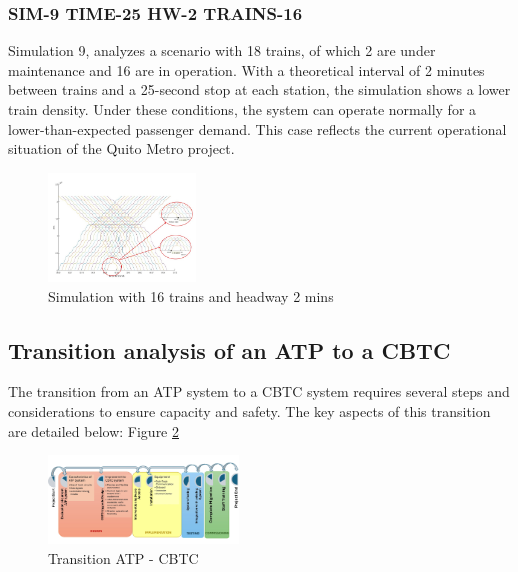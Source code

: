 \documentclass[conference]{IEEEtran}
\begin{document}
\subsubsection{SIM-9 TIME-25 HW-2 TRAINS-16}
Simulation 9, analyzes a scenario with 18 trains, of which 2 are under maintenance and 16 are in operation\cite{b20}. With a theoretical interval of 2 minutes between trains and a 25-second stop at each station, the simulation shows a lower train density. Under these conditions, the system can operate normally for a lower-than-expected passenger demand. This case reflects the current operational situation of the Quito Metro project\cite{b19}.
\begin{figure}[htbp]
    \centering
\includegraphics[width=0.35\textwidth,scale=1]{Imagenes_general/SIM-9_TIME-25_HW-2_TRAINS-16.jpg}
    \caption{Simulation with 16 trains and headway 2 mins}
    \label{fig:Simulation 9: 16 Trains / 2 mins headway}
\end{figure}

\subsection{Transition analysis of an ATP to a CBTC}
The transition from an ATP system to a CBTC system requires several steps and considerations to ensure capacity and safety. The key aspects of this transition are detailed below: Figure \ref{fig:Transition ATP - CBTC}
\begin{figure}[htbp]
    \centering
\includegraphics[width=0.45\textwidth,scale=1]{Imagenes_general/PROCESOS_TRANSITION.jpg}
    \caption{Transition ATP - CBTC}
    \label{fig:Transition ATP - CBTC}
\end{figure}
\end{document}
